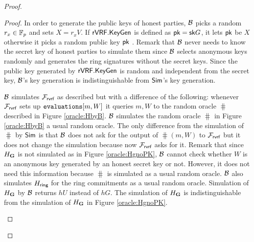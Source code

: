 \begin{proof}
\begin{proof}
			In order to generate the public keys of honest parties, $ \mathcal{B} $ picks a random $ r_x\in \mathbb{F}_p $ and sets $ X =r_xV$. If $ {\mathsf{rVRF}}.{\mathsf{KeyGen}} $ is defined as $ \mathsf{pk} = \mathsf{sk} G $, it lets $ \mathsf{pk} $ be $ X $ otherwise it picks a random public key $ \mathsf{pk} $ .
			Remark that $ \mathcal{B}$  never needs to know the secret key of honest parties to simulate them since $ \mathcal{B} $ selects anonymous keys randomly  and generates the ring signatures  without the secret keys. Since the public key generated by $ {\mathsf{rVRF}}.{\mathsf{KeyGen}} $ is random and independent from the secret key, $ \mathcal{B} $'s key generation is indistinguishable from $ \mathsf{Sim} $'s key generation.
			
				
			$ \mathcal{B} $ simulates $ \mathcal{F}_{\textsf{rvrf}} $ as described but with a difference of the following: whenever $ \mathcal{F}_{\textsf{rvrf}} $ sets up $ \texttt{evaluations}[m,W] $ it queries $ m,W $ to the random oracle $ \hash $ described in Figure \ref{oracle:HbyB}. $ \mathcal{B} $ simulates the random oracle $ \hash $ in Figure \ref{oracle:HbyB} a usual random oracle.
			The only difference from the simulation of $ \hash $ by $ \mathsf{Sim} $ is that $ \mathcal{B} $ does not ask for the output of $ \hash(m,W) $ to $ \mathcal{F}_{\textsf{rvrf}} $ but it does not change the simulation because now $\mathcal{F}_{\textsf{rvrf}} $ asks for it.  Remark that since $ H_{\mathbf{G}} $ is not simulated as in Figure \ref{oracle:HgnoPK}, $ \mathcal{B} $ cannot check whether $ W $ is an anonymous key generated by an honest secret key or not.  However, it does not need this information because $ \hash $ is simulated as a usual random oracle. $ \mathcal{B} $ also simulates $ H_\mathsf{ring} $ for the ring commitments as a usual random oracle. 			
			Simulation of $ H_{\mathbf{G}} $ by $ \mathcal{B} $ returns $ hU $ instead of $ hG $. The simulation of $ H_{\mathbf{G}} $ is indistinguishable from the simulation of $ H_{\mathbf{G}} $ in Figure \ref{oracle:HgnoPK}. 
			
			\begin{figure}
				\centering
				
				\noindent{}
\end{figure}
\end{proof}
\end{proof}
